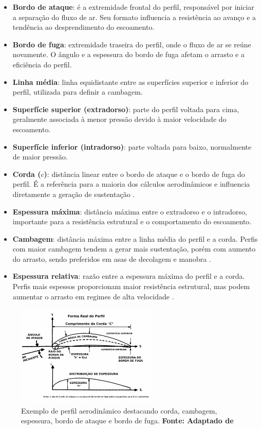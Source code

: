 \begin{itemize}
    \item \textbf{Bordo de ataque}: é a extremidade frontal do perfil, responsável por iniciar a separação do fluxo de ar. Seu formato influencia a resistência ao avanço e a tendência ao desprendimento do escoamento.
    \item \textbf{Bordo de fuga}: extremidade traseira do perfil, onde o fluxo de ar se reúne novamente. O ângulo e a espessura do bordo de fuga afetam o arrasto e a eficiência do perfil.
    \item \textbf{Linha média}: linha equidistante entre as superfícies superior e inferior do perfil, utilizada para definir a cambagem.
    \item \textbf{Superfície superior (extradorso)}: parte do perfil voltada para cima, geralmente associada à menor pressão devido à maior velocidade do escoamento.
    \item \textbf{Superfície inferior (intradorso)}: parte voltada para baixo, normalmente de maior pressão.
    \item \textbf{Corda (\(c\))}: distância linear entre o bordo de ataque e o bordo de fuga do perfil. É a referência para a maioria dos cálculos aerodinâmicos e influencia diretamente a geração de sustentação \cite{anderson2017fundamentals}.
    \item \textbf{Espessura máxima}: distância máxima entre o extradorso e o intradorso, importante para a resistência estrutural e o comportamento do escoamento.
    \item \textbf{Cambagem}: distância máxima entre a linha média do perfil e a corda. Perfis com maior cambagem tendem a gerar mais sustentação, porém com aumento do arrasto, sendo preferidos em asas de decolagem e manobra \cite{abbott1959theory}.
    \item \textbf{Espessura relativa}: razão entre a espessura máxima do perfil e a corda. Perfis mais espessos proporcionam maior resistência estrutural, mas podem aumentar o arrasto em regimes de alta velocidade \cite{anderson2017fundamentals}.
\end{itemize}

\begin{figure}[H]
    \centering
    \includegraphics[width=0.6\textwidth]{figures/perfil_parametros.jpg}
    \caption{Exemplo de perfil aerodinâmico destacando corda, cambagem, espessura, bordo de ataque e bordo de fuga. \textbf{Fonte: Adaptado de \cite{raymer2018aircraft}}}
    \label{fig:perfil_parametros}
\end{figure}


